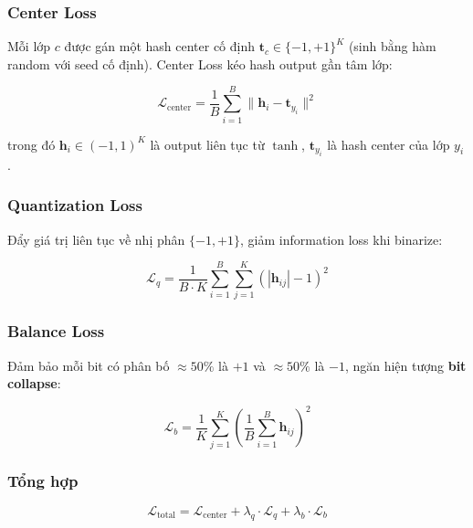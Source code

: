 \documentclass[13pt,a4paper]{article}
\begin{document}
\subsubsection{Center Loss}

Mỗi lớp $c$ được gán một hash center cố định $\mathbf{t}_c \in \{-1,+1\}^K$ (sinh bằng hàm random với seed cố định). Center Loss kéo hash output gần tâm lớp:

\begin{equation}
\mathcal{L}_{\text{center}} = \frac{1}{B}\sum_{i=1}^{B} \|\mathbf{h}_i - \mathbf{t}_{y_i}\|^2
\label{eq:center_loss}
\end{equation}

trong đó $\mathbf{h}_i \in (-1,1)^K$ là output liên tục từ $\tanh$, $\mathbf{t}_{y_i}$ là hash center của lớp $y_i$.

\subsubsection{Quantization Loss}

Đẩy giá trị liên tục về nhị phân $\{-1, +1\}$, giảm information loss khi binarize:

\begin{equation}
\mathcal{L}_q = \frac{1}{B \cdot K}\sum_{i=1}^{B}\sum_{j=1}^{K} (|\mathbf{h}_{ij}| - 1)^2
\label{eq:quant_loss}
\end{equation}

\subsubsection{Balance Loss}

Đảm bảo mỗi bit có phân bố $\approx 50\%$ là $+1$ và $\approx 50\%$ là $-1$, ngăn hiện tượng \textbf{bit collapse}:

\begin{equation}
\mathcal{L}_b = \frac{1}{K}\sum_{j=1}^{K}\left(\frac{1}{B}\sum_{i=1}^{B}\mathbf{h}_{ij}\right)^2
\label{eq:balance_loss}
\end{equation}

\subsubsection{Tổng hợp}

\begin{equation}
\boxed{\mathcal{L}_{\text{total}} = \mathcal{L}_{\text{center}} + \lambda_q \cdot \mathcal{L}_q + \lambda_b \cdot \mathcal{L}_b}
\label{eq:total_loss}
\end{equation}
\end{document}
